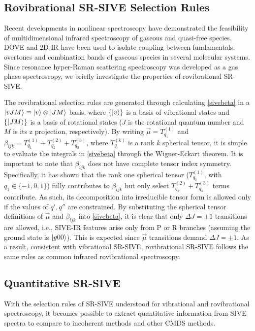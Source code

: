 \documentclass[aip, jcp, reprint, twocolumn]{revtex4-2}
\begin{document}
\subsection{Rovibrational SR-SIVE Selection Rules} %
Recent developments in nonlinear spectroscopy have demonstrated the feasibility of multidimensional infrared spectroscopy of gaseous and quasi-free species. \cite{Ziegler2018, Gronborg2022, RN325, Chen2024}
DOVE and 2D-IR have been used to isolate coupling between fundamentals, overtones and combination bands of gaseous species in several molecular systems. 
Since resonance hyper-Raman scattering spectroscopy was developed as a gas phase spectroscopy,\cite{RN515} we briefly investigate the properties of rovibrational SR-SIVE.

The rovibrational selection rules are generated through calculating \autoref{sivebeta} in a $\ket{vJM} \equiv \ket{v} \otimes {\ket{JM}}$ basis, where $\{\ket{v}\}$ is a basis of vibrational states and $\{\ket{JM}\}$ is a basis of rotational states ($J$ is the rotational quantum number and $M$ is its z projection, respectively).
By writing $\vec{\mu} = T_{q_1}^{(1)}$ and $\beta_{ijk} = T_{q_1}^{(1)} + T_{q_2}^{(2)} + T_{q_3}^{(3)}$, where $T^{(k)}_{q}$ is a rank $k$ spherical tensor, it is simple to evaluate the integrals in \autoref{sivebeta} through the Wigner-Eckart theorem. \cite{Kowzan2022}
It is important to note that $\beta_{ijk}$ does not have complete tensor index symmetry.
Specifically, it has shown that the rank one spherical tensor ($T_{q_1}^{(1)}$, with $q_1 \in \{-1, 0 ,1\}$) fully contributes to $\beta_{ijk}$ but only select $T_{q_2}^{(2)} + T_{q_3}^{(3)}$ terms contribute. \cite{Andrews1978, Andrews1990}
As such, its decomposition into irreducible tensor form is allowed only if the values of $q', q''$ are constrained.
By substituting the spherical tensor definitions of $\vec{\mu}$ and $\beta_{ijk}$ into \autoref{sivebeta}, it is clear that only $\Delta J = \pm 1$ transitions are allowed, i.e., SIVE-IR features arise only from P or R branches (assuming the ground state is $\ket{g00}$).
This is expected since $\vec{\mu}$ transitions demand $\Delta J = \pm 1$.
As a result, consistent with vibrational SR-SIVE, rovibrational SR-SIVE follows the same rules as common infrared rovibrational spectroscopy.

\subsection{Quantitative SR-SIVE}
With the selection rules of SR-SIVE understood for vibrational and rovibrational spectroscopy, it becomes possible to extract quantitative information from SIVE spectra to compare to incoherent methods and other CMDS methods.
\end{document}
